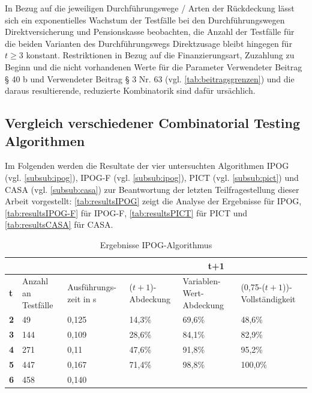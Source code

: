 In Bezug auf die jeweiligen Durchführungswege / Arten der Rückdeckung lässt sich ein exponentielles Wachstum der Testfälle bei den Durchführungswegen Direktversicherung und Pensionskasse beobachten, die Anzahl der Testfälle für die beiden Varianten des Durchführungswegs Direktzusage bleibt hingegen für $t\geq 3$ konstant. Restriktionen in Bezug auf die Finanzierungsart, Zuzahlung zu Beginn und die nicht vorhandenen Werte für die Parameter Verwendeter Beitrag § 40 b und Verwendeter Beitrag § 3 Nr. 63 (vgl. \autoref{tab:beitragsgrenzen}) und die daraus resultierende, reduzierte Kombinatorik sind dafür ursächlich. 

\subsection{Vergleich verschiedener Combinatorial Testing Algorithmen}\label{subsec:resultsTools}

Im Folgenden werden die Resultate der vier untersuchten Algorithmen IPOG  (vgl. \autoref{subsub:ipog}), IPOG-F (vgl. \autoref{subsub:ipog}), PICT (vgl. \autoref{subsub:pict}) und CASA (vgl. \autoref{subsub:casa}) zur Beantwortung der letzten Teilfragestellung dieser Arbeit vorgestellt: \autoref{tab:resultsIPOG} zeigt die Analyse der Ergebnisse für IPOG, \autoref{tab:resultsIPOG-F} für IPOG-F, \autoref{tab:resultsPICT} für PICT und \autoref{tab:resultsCASA} für CASA.

\begin{table}[!b]
\footnotesize
\begin{tabular}{|M{0.06\textwidth}|M{}|M{}||M{}|M{}|M{}|}
\hline
  &     &       &                                             \\ \hline
\textbf{t} & Anzahl an Testfälle & Ausführungs- zeit in s & ($t+1$)-Abdeckung & Variablen-Wert-Abdeckung & (0,75-($t+1$))-Vollständigkeit \\ \hline
\textbf{2} & 49  & 0,125 & 14,3\% & 69,6\% & 48,6\%  \\
\textbf{3} & 144 & 0,109 & 28,6\% & 84,1\% & 82,9\%  \\
\textbf{4} & 271 & 0,11  & 47,6\% & 91,8\% & 95,2\%  \\
\textbf{5} & 447 & 0,167 & 71,4\% & 98,8\% & 100,0\% \\
\textbf{6} & 458 & 0,140  &        &      &         \\ \hline
\end{tabular}
\normalsize
\caption{Ergebnisse IPOG-Algorithmus}
\label{tab:resultsIPOG}
\end{table}

